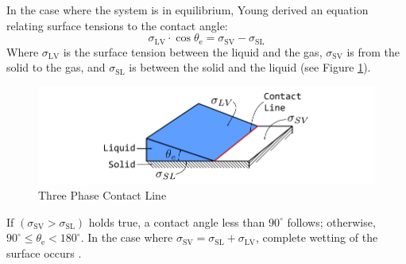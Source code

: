 In the case where the system is in equilibrium, Young  derived an equation relating surface tensions to the contact angle:
\begin{equation}
    \sigma_{\mathrm{LV}} \cdot \cos\theta_{\mathrm{e}} = \sigma_{\mathrm{SV}}-\sigma_{\mathrm{SL}}
    \label{eq: YoungsEQ}
\end{equation}
Where $\sigma_{\mathrm{LV}}$ is the surface tension between the liquid and the gas, $\sigma_{\mathrm{SV}}$ is from the solid to the gas, and $\sigma_{\mathrm{SL}}$ is between the solid and the liquid (see Figure \ref{fig: YoungsLaw_ThreePhaseContactLine}).
\begin{figure}[h]
    \centering
    \includegraphics[width=.9\textwidth]{Pictures/YoungsLaw.pdf}
    \caption{Three Phase Contact Line}
    \label{fig: YoungsLaw_ThreePhaseContactLine}
\end{figure}
If $(\sigma_{\mathrm{SV}}>\sigma_{\mathrm{SL}})$ holds true, a contact angle less than $90^{\circ}$ follows; otherwise, $90^{\circ}\leq \theta_{\mathrm{e}}<180^{\circ}$. In the case where $\sigma_{\mathrm{SV}}=\sigma_{\mathrm{SL}}+\sigma_{\mathrm{LV}}$, complete wetting of the surface occurs \cite{buttPhysicsChemistryInterfaces}.

